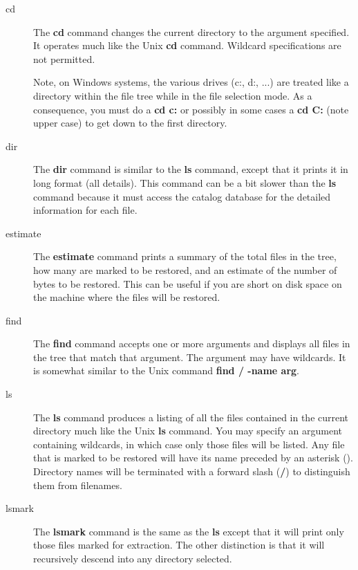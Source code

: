 \begin{description}

\item [cd]
   The {\bf cd} command changes the current directory to  the argument specified.
   It operates much like the Unix {\bf cd} command.  Wildcard specifications are
not permitted.  

Note, on Windows systems, the various drives (c:, d:, ...) are treated  like a
directory within the file tree while in the file  selection mode. As a
consequence, you must do a {\bf cd c:} or  possibly in some cases a {\bf cd
C:} (note upper case)  to get down to the first directory.  

\item [dir]
   The {\bf dir} command is similar to the {\bf ls} command,  except that it
prints it in long format (all details). This command  can be a bit slower than
the {\bf ls} command because it must access  the catalog database for the
detailed information for each file.  

\item [estimate]
   The {\bf estimate} command prints a summary of  the total files in the tree,
how many are marked to be restored, and  an estimate of the number of bytes to
be restored. This can be useful  if you are short on disk space on the machine
where the files will be  restored.  

\item [find]
   The {\bf find} command accepts one or more arguments  and displays all files
in the tree that match that argument. The argument  may have wildcards. It is
somewhat similar to the Unix command  {\bf find / -name arg}.  

\item [ls]
   The {\bf ls} command produces a listing of all the files  contained in the
   current directory much like the Unix {\bf ls} command.  You may specify an
argument containing wildcards, in which case only  those files will be listed.
Any file that is marked to be restored will  have its name preceded by an
asterisk ({\bf *}). Directory names  will be terminated with a forward slash
({\bf /}) to distinguish them  from filenames.  

\item [lsmark]
   The {\bf lsmark} command is the same as the  {\bf ls} except that it will
print only those files marked for  extraction. The other distinction is that
it will recursively  descend into any directory selected. 


\end{description}
